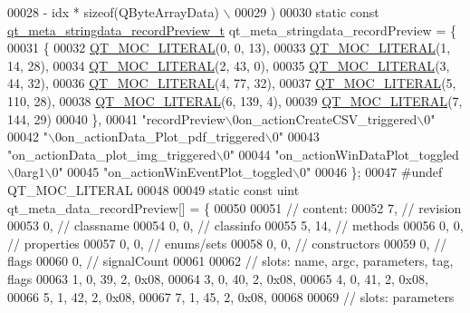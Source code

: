 \begin{DoxyCode}
00028 \textcolor{preprocessor}{        - idx * sizeof(QByteArrayData) \(\backslash\)}
00029 \textcolor{preprocessor}{    )}
00030 \textcolor{keyword}{static} \textcolor{keyword}{const} \hyperlink{a00017_df/d6a/a00119}{qt\_meta\_stringdata\_recordPreview\_t} 
      qt\_meta\_stringdata\_recordPreview = \{
00031     \{
00032 \hyperlink{a00017_a75bb9482d242cde0a06c9dbdc6b83abe}{QT\_MOC\_LITERAL}(0, 0, 13),
00033 \hyperlink{a00017_a75bb9482d242cde0a06c9dbdc6b83abe}{QT\_MOC\_LITERAL}(1, 14, 28),
00034 \hyperlink{a00017_a75bb9482d242cde0a06c9dbdc6b83abe}{QT\_MOC\_LITERAL}(2, 43, 0),
00035 \hyperlink{a00017_a75bb9482d242cde0a06c9dbdc6b83abe}{QT\_MOC\_LITERAL}(3, 44, 32),
00036 \hyperlink{a00017_a75bb9482d242cde0a06c9dbdc6b83abe}{QT\_MOC\_LITERAL}(4, 77, 32),
00037 \hyperlink{a00017_a75bb9482d242cde0a06c9dbdc6b83abe}{QT\_MOC\_LITERAL}(5, 110, 28),
00038 \hyperlink{a00017_a75bb9482d242cde0a06c9dbdc6b83abe}{QT\_MOC\_LITERAL}(6, 139, 4),
00039 \hyperlink{a00017_a75bb9482d242cde0a06c9dbdc6b83abe}{QT\_MOC\_LITERAL}(7, 144, 29)
00040     \},
00041     \textcolor{stringliteral}{"recordPreview\(\backslash\)0on\_actionCreateCSV\_triggered\(\backslash\)0"}
00042     \textcolor{stringliteral}{"\(\backslash\)0on\_actionData\_Plot\_pdf\_triggered\(\backslash\)0"}
00043     \textcolor{stringliteral}{"on\_actionData\_plot\_img\_triggered\(\backslash\)0"}
00044     \textcolor{stringliteral}{"on\_actionWinDataPlot\_toggled\(\backslash\)0arg1\(\backslash\)0"}
00045     \textcolor{stringliteral}{"on\_actionWinEventPlot\_toggled\(\backslash\)0"}
00046 \};
00047 \textcolor{preprocessor}{#undef QT\_MOC\_LITERAL}
00048 
00049 \textcolor{keyword}{static} \textcolor{keyword}{const} uint qt\_meta\_data\_recordPreview[] = \{
00050 
00051  \textcolor{comment}{// content:}
00052        7,       \textcolor{comment}{// revision}
00053        0,       \textcolor{comment}{// classname}
00054        0,    0, \textcolor{comment}{// classinfo}
00055        5,   14, \textcolor{comment}{// methods}
00056        0,    0, \textcolor{comment}{// properties}
00057        0,    0, \textcolor{comment}{// enums/sets}
00058        0,    0, \textcolor{comment}{// constructors}
00059        0,       \textcolor{comment}{// flags}
00060        0,       \textcolor{comment}{// signalCount}
00061 
00062  \textcolor{comment}{// slots: name, argc, parameters, tag, flags}
00063        1,    0,   39,    2, 0x08,
00064        3,    0,   40,    2, 0x08,
00065        4,    0,   41,    2, 0x08,
00066        5,    1,   42,    2, 0x08,
00067        7,    1,   45,    2, 0x08,
00068 
00069  \textcolor{comment}{// slots: parameters}

\end{DoxyCode}
